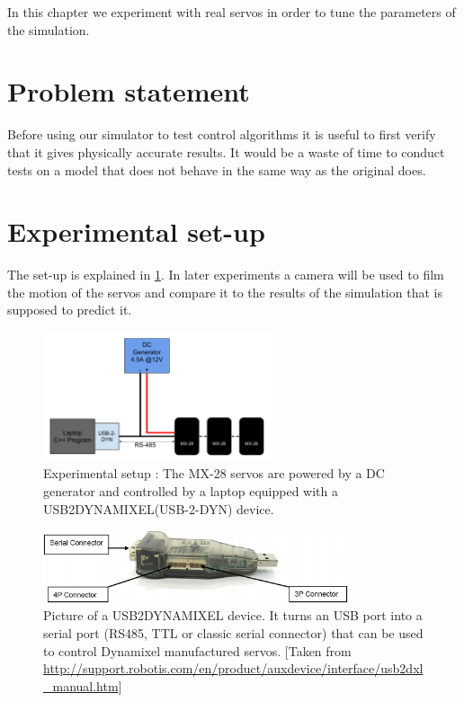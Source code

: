 In this chapter we experiment with real servos in order to tune the parameters of the simulation.

\section{Problem statement}
Before using our simulator to test control algorithms it is useful to first verify that it gives physically accurate results. It would be a waste of time to conduct tests on a model that does not behave in the same way as the original does.

\section{Experimental set-up}
The set-up is explained in \cref{fig:exp_setup}. In later experiments a camera will be used to film the motion of the servos and compare it to the results of the simulation that is supposed to predict it.

\begin{figure}[htp]
\center
\includegraphics[width=0.6\textwidth]{figures/exp_setup}
\caption[Experimental setup]{Experimental setup : The MX-28 servos are powered by a DC generator and controlled by a laptop equipped with a USB2DYNAMIXEL(USB-2-DYN) device.}
\label{fig:exp_setup}
\end{figure}

\begin{figure}[htp]
\center
    \includegraphics[width = 0.8\textwidth]{figures/u2d}
    \caption[USB2DYNAMIXEL]{Picture of a USB2DYNAMIXEL device. It turns an USB port into a serial port (RS485, TTL or classic serial connector) that can be used to control Dynamixel manufactured servos. [Taken from \url{http://support.robotis.com/en/product/auxdevice/interface/usb2dxl_manual.htm}]}
    \label{fig:usb2dyn}
\end{figure}

